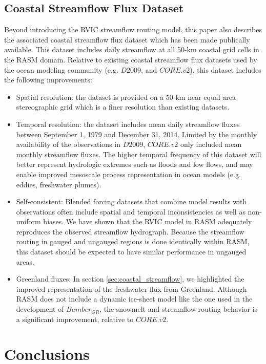 \documentclass[jgrga, draft]{agutex}
\begin{document}
\begin{article}
\subsection{Coastal Streamflow Flux Dataset}
Beyond introducing the RVIC streamflow routing model, this paper also describes the associated coastal streamflow flux dataset which has been made publically available.
This dataset includes daily streamflow at all 50-km coastal grid cells in the RASM domain.
Relative to existing coastal streamflow flux datasets used by the ocean modeling community (e.g. $D2009$, and $CORE.v2$), this dataset includes the following improvements:

\begin{itemize}[leftmargin=+.5in]
  \item Spatial resolution: the dataset is provided on a 50-km near equal area stereographic grid which is a finer resolution than existing datasets.
  \item Temporal resolution: the dataset includes mean daily streamflow fluxes between September 1, 1979 and December 31, 2014. Limited by the monthly availability of the observations in $D2009$, $CORE.v2$ only included mean monthly streamflow fluxes.
  The higher temporal frequency of this dataset will better represent hydrologic extremes such as floods and low flows, and may enable improved mesoscale process representation in ocean models (e.g. eddies, freshwater plumes).
  \item Self-consistent: Blended forcing datasets that combine model results with observations often include spatial and temporal inconsistencies as well as non-uniform biases. We have shown that the RVIC model in RASM adequately reproduces the observed streamflow hydrograph. Because the streamflow routing in gauged and ungauged regions is done identically within RASM, this dataset should be expected to have similar performance in ungauged areas.
  \item Greenland fluxes: In section \ref{sec:coastal_streamflow}, we highlighted the improved representation of the freshwater flux from Greenland. Although RASM does not include a dynamic ice-sheet model like the one used in the development of $Bamber_{GR}$, the snowmelt and streamflow routing behavior is a significant improvement, relative to $CORE.v2$.
\end{itemize}

\section{Conclusions}
\label{sec:conclusions}


\end{article}
\end{document}
